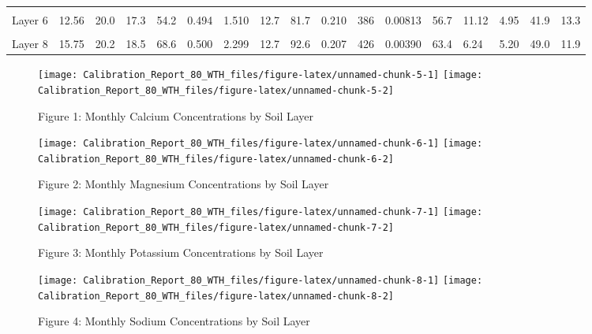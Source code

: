 \documentclass[
]{article}
\begin{document}
\begin{table}[!h]
{\begin{tabular}[t]{lllllllllllllllll}
\cellcolor{gray!6}{Layer 5} & \cellcolor{gray!6}{13.44} & \cellcolor{gray!6}{22.2} & \cellcolor{gray!6}{15.2} & \cellcolor{gray!6}{51.6} & \cellcolor{gray!6}{0.505} & \cellcolor{gray!6}{1.278} & \cellcolor{gray!6}{12.7} & \cellcolor{gray!6}{76.1} & \cellcolor{gray!6}{0.178} & \cellcolor{gray!6}{424} & \cellcolor{gray!6}{0.00642} & \cellcolor{gray!6}{53.1} & \cellcolor{gray!6}{9.34} & \cellcolor{gray!6}{5.03} & \cellcolor{gray!6}{46.7} & \cellcolor{gray!6}{13.9}\\
\addlinespace
Layer 6 & 12.56 & 20.0 & 17.3 & 54.2 & 0.494 & 1.510 & 12.7 & 81.7 & 0.210 & 386 & 0.00813 & 56.7 & 11.12 & 4.95 & 41.9 & 13.3\\
\cellcolor{gray!6}{Layer 7} & \cellcolor{gray!6}{15.97} & \cellcolor{gray!6}{21.8} & \cellcolor{gray!6}{16.2} & \cellcolor{gray!6}{61.0} & \cellcolor{gray!6}{0.491} & \cellcolor{gray!6}{1.947} & \cellcolor{gray!6}{12.7} & \cellcolor{gray!6}{88.0} & \cellcolor{gray!6}{0.243} & \cellcolor{gray!6}{430} & \cellcolor{gray!6}{0.00499} & \cellcolor{gray!6}{61.1} & \cellcolor{gray!6}{7.62} & \cellcolor{gray!6}{5.12} & \cellcolor{gray!6}{48.4} & \cellcolor{gray!6}{13.0}\\
Layer 8 & 15.75 & 20.2 & 18.5 & 68.6 & 0.500 & 2.299 & 12.7 & 92.6 & 0.207 & 426 & 0.00390 & 63.4 & 6.24 & 5.20 & 49.0 & 11.9\\
\bottomrule
\end{tabular}}
\end{table}

\begin{figure}[H]
\texttt{[image: Calibration\_Report\_80\_WTH\_files/figure-latex/unnamed-chunk-5-1]} \texttt{[image: Calibration\_Report\_80\_WTH\_files/figure-latex/unnamed-chunk-5-2]} \caption{Figure 1: Monthly Calcium Concentrations by Soil Layer}\label{fig:unnamed-chunk-5}
\end{figure}
\begin{figure}[H]
\texttt{[image: Calibration\_Report\_80\_WTH\_files/figure-latex/unnamed-chunk-6-1]} \texttt{[image: Calibration\_Report\_80\_WTH\_files/figure-latex/unnamed-chunk-6-2]} \caption{Figure 2: Monthly Magnesium Concentrations by Soil Layer}\label{fig:unnamed-chunk-6}
\end{figure}
\begin{figure}[H]
\texttt{[image: Calibration\_Report\_80\_WTH\_files/figure-latex/unnamed-chunk-7-1]} \texttt{[image: Calibration\_Report\_80\_WTH\_files/figure-latex/unnamed-chunk-7-2]} \caption{Figure 3: Monthly Potassium Concentrations by Soil Layer}\label{fig:unnamed-chunk-7}
\end{figure}
\begin{figure}[H]
\texttt{[image: Calibration\_Report\_80\_WTH\_files/figure-latex/unnamed-chunk-8-1]} \texttt{[image: Calibration\_Report\_80\_WTH\_files/figure-latex/unnamed-chunk-8-2]} \caption{Figure 4: Monthly Sodium Concentrations by Soil Layer}\label{fig:unnamed-chunk-8}
\end{figure}
\end{document}
